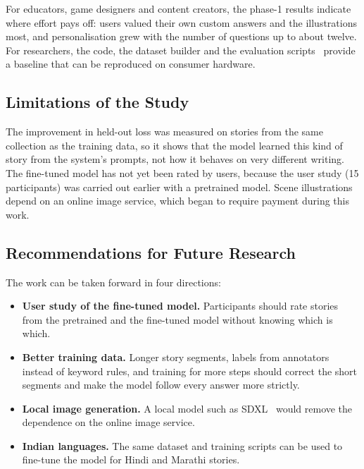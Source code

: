 For educators, game designers and content creators, the phase-1 results indicate where effort pays off: users valued their own custom answers and the illustrations most, and personalisation grew with the number of questions up to about twelve. For researchers, the code, the dataset builder and the evaluation scripts~\cite{jha2026repo} provide a baseline that can be reproduced on consumer hardware.

\subsection{Limitations of the Study}

The improvement in held-out loss was measured on stories from the same collection as the training data, so it shows that the model learned this kind of story from the system's prompts, not how it behaves on very different writing. The fine-tuned model has not yet been rated by users, because the user study (15 participants) was carried out earlier with a pretrained model. Scene illustrations depend on an online image service, which began to require payment during this work.

\subsection{Recommendations for Future Research}

The work can be taken forward in four directions:

\begin{itemize}
    \item \textbf{User study of the fine-tuned model.} Participants should rate stories from the pretrained and the fine-tuned model without knowing which is which.
    \item \textbf{Better training data.} Longer story segments, labels from annotators instead of keyword rules, and training for more steps should correct the short segments and make the model follow every answer more strictly.
    \item \textbf{Local image generation.} A local model such as SDXL~\cite{podell2024sdxl} would remove the dependence on the online image service.
    \item \textbf{Indian languages.} The same dataset and training scripts can be used to fine-tune the model for Hindi and Marathi stories.
\end{itemize}
